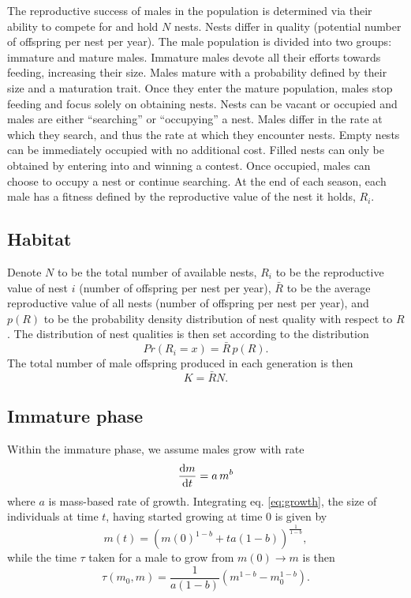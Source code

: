 \documentclass[a4paper,11pt]{article}
\begin{document}
The reproductive success of males in the population is determined via their ability to compete for and hold $N$ nests. Nests differ in quality (potential number of offspring per nest per year). The male population is divided into two groups: immature and mature males. Immature males devote all their efforts towards feeding, increasing their size. Males mature with a probability defined by their size and a maturation trait. Once they enter the mature population, males stop feeding and focus solely on obtaining nests. Nests can be vacant or occupied and males are either ``searching'' or ``occupying'' a nest. Males differ in the rate at which they search, and thus the rate at which they encounter nests. Empty nests can be immediately occupied with no additional cost. Filled nests can only be obtained by entering into and winning a contest. Once occupied, males can choose to occupy a nest or continue searching. At the end of each season, each male has a fitness defined by the reproductive value of the nest it holds, $R_i$.

\subsection{Habitat}

Denote $N$ to be the total number of available nests, $R_i$ to be the reproductive value of nest $i$ (number of offspring per nest per year), $\bar{R}$ to be the average reproductive value of all nests (number of offspring per nest per year), and $p(R)$ to be the probability density distribution of nest quality with respect to $R$. The distribution of nest qualities is then set according to the distribution
\begin{equation} \label{eq:pdf_R}
Pr(R_i = x) =\bar{R} \, p(R).
\end{equation}
The total number of male offspring produced in each generation is then
\begin{equation} \label{eq:pdf_R}
K = \bar{R} N.
\end{equation}

\subsection{Immature phase}

Within the immature phase, we assume males grow with rate
\begin{equation} \label{eq:growth}
\frac{{\rm d} m}{{\rm d} t} = a \, m^ b
\end{equation}
where $a$ is mass-based rate of growth. Integrating eq. \ref{eq:growth}, the size of individuals at time $t$, having started growing at time $0$ is given by
\begin{equation} \label{eq:growth}
m(t) = \left(m(0)^{1-b} + t a(1-b)\right)^{\frac1{1-b}},
\end{equation}
while the time $\tau$ taken for a male to grow from $m(0) \rightarrow m$ is then
\begin{equation} \label{eq:tau}
\tau(m_0, m) = \frac1{a(1-b)}\left(m ^{1-b} - m_0 ^{1-b}\right).
\end{equation}
\end{document}
